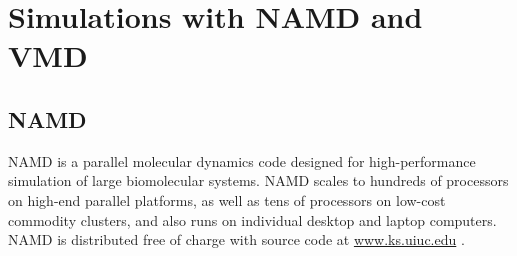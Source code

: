 \section{Simulations with NAMD and VMD}\label{sec:software}

\subsection{NAMD}\label{ssec:NAMD-expl}
NAMD is a parallel molecular dynamics code designed for high-performance simulation of large biomolecular systems. NAMD scales to hundreds of processors on high-end parallel platforms, as well as tens of processors on low-cost commodity clusters, and also runs on individual desktop and laptop computers. NAMD is distributed free of charge with source code at \url{www.ks.uiuc.edu} \cite{ref:NAMD}.

%
%
%
%
%
%
%

